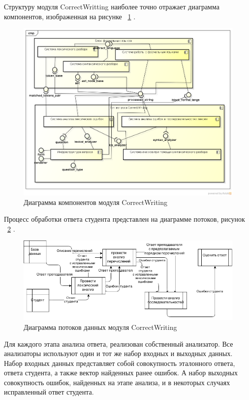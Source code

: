 \documentclass[a4paper,english,russian]{G2-105}
\begin{document}
\par Структуру модуля CorrectWritting наиболее точно отражает диаграмма компонентов, изображенная на рисунке ~\ref{component} \cite{6}.
\begin{figure}
    \includegraphics[width=\linewidth]{component.png}
    \caption{Диаграмма компонентов модуля CorrectWriting}
	\label{component}
\end{figure}
\par Процесс обработки ответа студента представлен на диаграмме потоков, рисунок ~\ref{dfd} \cite{7}.
\newpage
\begin{figure}
    \includegraphics[width=\linewidth]{dfd1.png}
    \caption{Диаграмма потоков данных модуля CorrectWriting}
	\label{dfd}
\end{figure}
\par Для каждого этапа анализа ответа, реализован собственный анализатор. Все анализаторы используют один и тот же набор входных и выходных данных. Набор входных данных представляет собой совокупность эталонного ответа, ответа студента, а также вектор найденных ранее ошибок. А набор выходных совокупность ошибок, найденных на этапе анализа, и в некоторых случаях исправленный ответ студента. 
\end{document}
